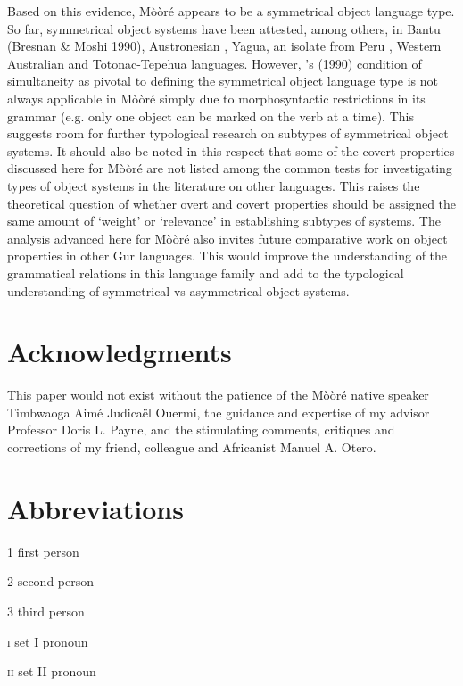 \documentclass[output=paper]{langsci/langscibook}
\begin{document}
Based on this evidence, M\`{o}\`{o}r\'{e} appears to be a symmetrical object language type. So far, symmetrical object systems have been attested, among others, in Bantu (Bresnan \& Moshi 1990), Austronesian \citep{donohue1996}, Yagua, an isolate from Peru \citep{paynepayne1989}, Western Australian \citep{dench1995} and Totonac-Tepehua \citep{mckaytrechsel2008} languages. However, \citeauthor{bresnanmoshi1990}'s (1990)  condition of simultaneity as pivotal to defining the symmetrical object language type is not always applicable in M\`{o}\`{o}r\'{e} simply due to morphosyntactic restrictions in its grammar (e.g. only one object can be marked on the verb at a time). This suggests room for further typological research on subtypes of symmetrical object systems. It should also be noted in this respect that some of the covert properties discussed here for M\`{o}\`{o}r\'{e} are not listed among the common tests for investigating types of object systems in the literature on other languages. This raises the theoretical question of whether overt and covert properties should be assigned the same amount of `weight' or `relevance' in establishing subtypes of systems. The analysis advanced here for M\`{o}\`{o}r\'{e} also invites future comparative work on object properties in other Gur languages. This would improve the understanding of the grammatical relations in this language family and add to the typological understanding of symmetrical vs asymmetrical object systems.

\section*{Acknowledgments}

This paper would not exist without the patience of the M\`{o}\`{o}r\'{e} native speaker Timbwaoga Aim\'{e} Judicaël Ouermi, the guidance and expertise of my advisor Professor Doris L. Payne, and the stimulating comments, critiques and corrections of my friend, colleague and Africanist Manuel A. Otero. 

\section*{Abbreviations}


1  first person

2  second person

3  third person

\textsc{i} set I pronoun

\textsc{ii} set II pronoun
\end{document}
